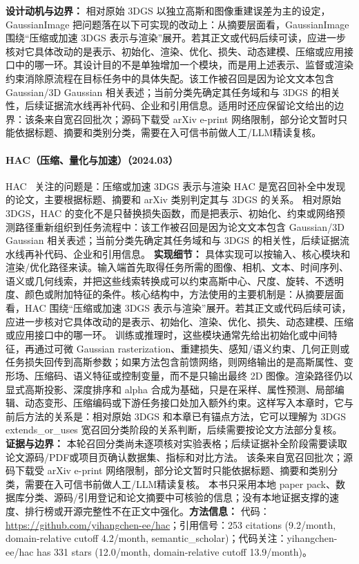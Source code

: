 \textbf{设计动机与边界：} 相对原始 3DGS 以独立高斯和图像重建误差为主的设定，GaussianImage 把问题落在以下可实现的改动上：从摘要层面看，GaussianImage 围绕“压缩或加速 3DGS 表示与渲染”展开。若其正文或代码后续可读，应进一步核对它具体改动的是表示、初始化、渲染、优化、损失、动态建模、压缩或应用接口中的哪一环。其设计目的不是单独增加一个模块，而是用上述表示、监督或渲染约束消除原流程在目标任务中的具体失配。该工作被召回是因为论文文本包含 Gaussian/3D Gaussian 相关表述；当前分类先确定其任务域和与 3DGS 的相关性，后续证据流水线再补代码、企业和引用信息。适用时还应保留论文给出的边界：该条来自宽召回批次；源码下载受 arXiv e-print 网络限制，部分论文暂时只能依据标题、摘要和类别分类，需要在入可信书前做人工/LLM精读复核。
\paragraph{HAC（压缩、量化与加速）（2024.03）}
HAC~\cite{2403_14530} 关注的问题是：压缩或加速 3DGS 表示与渲染 HAC 是宽召回补全中发现的论文，主要根据标题、摘要和 arXiv 类别判定其与 3DGS 的关系。
相对原始 3DGS，HAC 的变化不是只替换损失函数，而是把表示、初始化、约束或网络预测路径重新组织到任务流程中：该工作被召回是因为论文文本包含 Gaussian/3D Gaussian 相关表述；当前分类先确定其任务域和与 3DGS 的相关性，后续证据流水线再补代码、企业和引用信息。
\textbf{实现细节：} 具体实现可以按输入、核心模块和渲染/优化路径来读。输入端首先取得任务所需的图像、相机、文本、时间序列、语义或几何线索，并把这些线索转换成可以约束高斯中心、尺度、旋转、不透明度、颜色或附加特征的条件。核心结构中，方法使用的主要机制是：从摘要层面看，HAC 围绕“压缩或加速 3DGS 表示与渲染”展开。若其正文或代码后续可读，应进一步核对它具体改动的是表示、初始化、渲染、优化、损失、动态建模、压缩或应用接口中的哪一环。 训练或推理时，这些模块通常先给出初始化或中间特征，再通过可微 Gaussian rasterization、重建损失、感知/语义约束、几何正则或任务损失回传到高斯参数；如果方法包含前馈网络，则网络输出的是高斯属性、变形场、压缩码、语义特征或控制变量，而不是只输出最终 2D 图像。渲染路径仍以显式高斯投影、深度排序和 alpha 合成为基础，只是在采样、属性预测、局部编辑、动态变形、压缩编码或下游任务接口处加入额外约束。这样写入本章时，它与前后方法的关系是：相对原始 3DGS 和本章已有锚点方法，它可以理解为 3DGS extends\_or\_uses 宽召回分类阶段的关系判断，后续需要按论文方法部分复核。
\textbf{证据与边界：} 本轮召回分类尚未逐项核对实验表格；后续证据补全阶段需要读取论文源码/PDF或项目页确认数据集、指标和对比方法。 该条来自宽召回批次；源码下载受 arXiv e-print 网络限制，部分论文暂时只能依据标题、摘要和类别分类，需要在入可信书前做人工/LLM精读复核。 本书只采用本地 paper pack、数据库分类、源码/引用登记和论文摘要中可核验的信息；没有本地证据支撑的速度、排行榜或开源完整性不在正文中强化。\textbf{方法信息：} 代码：\url{https://github.com/yihangchen-ee/hac}；引用信号：253 citations (9.2/month, domain-relative cutoff 4.2/month, semantic\_scholar)；代码关注：yihangchen-ee/hac has 331 stars (12.0/month, domain-relative cutoff 13.9/month)。
